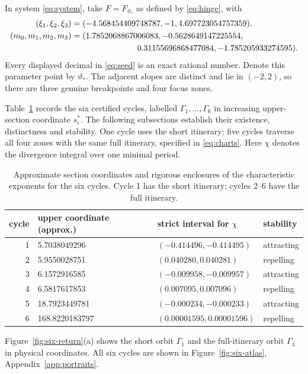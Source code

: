 \documentclass[11pt]{article}
\theoremstyle{remark}
\begin{document}
In system \eqref{eq:system}, take \(F=F_{\vartheta_*}\) as defined by
\eqref{eq:hinge}, with
\begin{equation}\label{eq:seed}
\begin{aligned}
 (\xi_1,\xi_2,\xi_3)&=(-4.568454409748787,-1,4.697723054757359),\\
 (m_0,m_1,m_2,m_3)&=(1.7852068867006083,-0.5628649147225554,\\
 &\hspace{28mm}0.31155696868477084,-1.785205933274595).
\end{aligned}
\end{equation}
Every displayed decimal in \eqref{eq:seed} is an exact rational number.
Denote this parameter point by \(\vartheta_*\).
The adjacent slopes are distinct and lie in \((-2,2)\), so there are
three genuine breakpoints and four focus zones.

Table~\ref{tab:six} records the six certified cycles, labelled
\(\Gamma_1,\ldots,\Gamma_6\) in increasing upper-section coordinate
\(s_i^*\).  The following subsections establish their existence,
distinctness and stability.  One cycle uses the short itinerary; five
cycles traverse all four zones with the same full itinerary, specified
in \eqref{eq:charts}.  Here \(\chi\) denotes the divergence integral
over one minimal period.
\begin{table}[H]
\centering
\begin{tabular}{rlll}
\toprule
cycle&upper coordinate (approx.)&strict interval for $\chi$&stability\\\midrule
1&5.7038049296&$(-0.414496,-0.414495)$&attracting\\
2&5.9550028751&$(0.040280,0.040281)$&repelling\\
3&6.1572916585&$(-0.009958,-0.009957)$&attracting\\
4&6.5817617853&$(0.007095,0.007096)$&repelling\\
5&18.7923449781&$(-0.000234,-0.000233)$&attracting\\
6&168.8220183797&$(0.00001595,0.00001596)$&repelling\\
\bottomrule
\end{tabular}
\caption{Approximate section coordinates and rigorous enclosures of the
characteristic exponents for the six cycles.  Cycle 1 has the short
itinerary; cycles 2--6 have the full itinerary.}
\label{tab:six}
\end{table}

Figure~\ref{fig:six-return}(a) shows the short orbit
\(\Gamma_1\) and the full-itinerary orbit \(\Gamma_4\) in physical
coordinates.  All six cycles are shown in
Figure~\ref{fig:six-atlas}, Appendix~\ref{app:portraits}.
\end{document}
